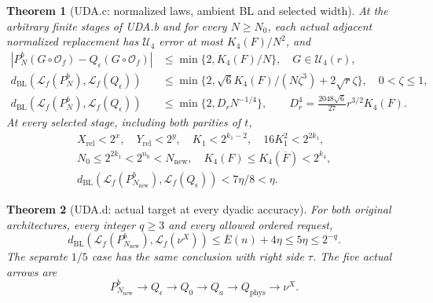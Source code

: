 \documentclass[11pt]{article}
\theoremstyle{plain}
\newtheorem{theorem}{Theorem}[section]
\theoremstyle{definition}
\theoremstyle{remark}
\begin{document}
\begin{theorem}[UDA.c: normalized laws, ambient BL and selected width]
\label{uda:clause-c}
At the arbitrary finite stages of UDA.b and for every $N\ge N_0$, each
actual adjacent normalized replacement has $\mathcal U_4$ error at most
$K_4(F)/N^2$, and
\begin{align*}
 |P_N^b(G\circ\mathcal O_f)-Q_\epsilon(G\circ\mathcal O_f)|
 &\le\min\{2,K_4(F)/N\},\quad G\in\mathcal U_4(r),\\
 d_{\mathrm{BL}}(\mathcal L_f(P_N^b),\mathcal L_f(Q_\epsilon))
 &\le\min\{2,\sqrt6K_4(F)/(N\zeta^3)+2\sqrt r\zeta\},\quad0<\zeta\le1,\\
 d_{\mathrm{BL}}(\mathcal L_f(P_N^b),\mathcal L_f(Q_\epsilon))
 &\le\min\{2,D_rN^{-1/4}\},\qquad
 D_r^4=\frac{2048\sqrt6}{27}r^{3/2}K_4(F).
\end{align*}
At every selected stage, including both parities of $t$,
\begin{gather*}
 X_{\mathrm{rel}}<2^x,\quad Y_{\mathrm{rel}}<2^y,\quad
 K_1<2^{k_1-2},\quad16K_1^2<2^{2k_1},\\
 N_0\le2^{2k_1}<2^{n_0}<N_{\mathrm{new}},\quad
 K_4(F)\le K_4(\overline F)<2^{k_4},\\
 d_{\mathrm{BL}}(\mathcal L_f(P_{N_{\mathrm{new}}}^b),
                  \mathcal L_f(Q_\epsilon))<7\eta/8<\eta.
\end{gather*}
\end{theorem}

\begin{theorem}[UDA.d: actual target at every dyadic accuracy]
\label{uda:clause-d}
For both original architectures, every integer $q\ge3$ and every allowed
ordered request,
\[
 d_{\mathrm{BL}}(\mathcal L_f(P_{N_{\mathrm{new}}}^b),\mathcal L_f(\nu^X))
 \le\overline E(n)+4\eta\le5\eta\le2^{-q}.
\]
The separate $1/5$ case has the same conclusion with right side $\tau$.
The five actual arrows are
\[
 P_{N_{\mathrm{new}}}^b\longrightarrow Q_\epsilon\longrightarrow Q_0
 \longrightarrow Q_a\longrightarrow Q_{\mathrm{phys}}\longrightarrow\nu^X.
\]
\end{theorem}
\end{document}
